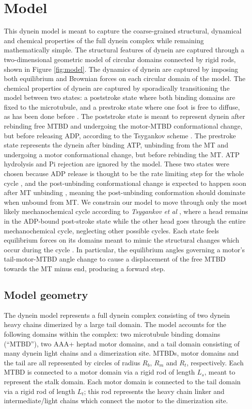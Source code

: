 \documentclass[9pt,twocolumn,twoside]{article}
\begin{document}
\section{Model}
This dynein model is meant to capture the coarse-grained structural, dynamical and chemical properties of the full dynein complex while remaining mathematically simple. The structural features of dynein are captured through a two-dimensional geometric model of circular domains connected by rigid rods, shown in Figure \ref{fig:model}. The dynamics of dynein are captured by imposing both equilibrium and Brownian forces on each circular domain of the model. The chemical properties of dynein are captured by sporadically transitioning the model between two states: a poststroke state where both binding domains are fixed to the microtubule, and a prestroke state where one foot is free to diffuse, as has been done before \cite{zhaomodel}. The poststroke state is meant to represent dynein after rebinding free MTBD and undergoing the motor-MTBD conformational change, but before releasing ADP, according to the Tsygankov scheme \cite{tsygankovscheme}. The prestroke state represents the dynein after binding ATP, unbinding from the MT and undergoing a motor conformational change, but before rebinding the MT. ATP hydrolysis and Pi rejection are ignored by the model. These two states were chosen because ADP release is thought to be the rate limiting step for the whole cycle \cite{holzbaur1989}, and the post-unbinding conformational change is expected to happen soon after MT unbinding \cite{mogamirate}, meaning the post-unbinding conformation should dominate when unbound from MT. We constrain our model to move through only the most likely mechanochemical cycle according to \textit{Tsygankov et al} \cite{tsygankovscheme}, where a head remains in the ADP-bound post-stroke state while the other head goes through the entire mechanochemical cycle, neglecting other possible cycles. Each state feels equilibrium forces on its domains meant to mimic the structural changes which occur during the cycle \cite{burgess-paper, burgessknight}. In particular, the equilibrium angles governing a motor's tail-motor-MTBD angle change to cause a displacement of the free MTBD towards the MT minus end, producing a forward step.

\subsection*{Model geometry}
The dynein model represents a full dynein complex consisting of two dynein heavy chains dimerized by a large tail domain. The model accounts for the following domains within the complex: two microtubule binding domains (``MTBD''), two AAA+ heptad motor domains, and a tail domain consisting of many dynein light chains and a dimerization site. MTBDs, motor domains and the tail are all represented by circles of radius $R_b$, $R_m$ and $R_t$, respectively. Each MTBD is connected to a motor domain via a rigid rod of length $L_s$, meant to represent the stalk domain. Each motor domain is connected to the tail domain via a rigid rod of length $L_t$; this rod represents the heavy chain linker and intermediate/light chains which connect the motor to the dimerization site.
\end{document}
